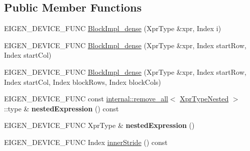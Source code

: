 \subsection*{Public Member Functions}
\begin{DoxyCompactItemize}
\item 
E\+I\+G\+E\+N\+\_\+\+D\+E\+V\+I\+C\+E\+\_\+\+F\+U\+NC \mbox{\hyperlink{class_eigen_1_1internal_1_1_block_impl__dense_3_01_xpr_type_00_01_block_rows_00_01_block_cols_00_01_inner_panel_00_01true_01_4_a72b340bbcd3acefc375e7a5eacd790f5}{Block\+Impl\+\_\+dense}} (Xpr\+Type \&xpr, Index i)
\item 
E\+I\+G\+E\+N\+\_\+\+D\+E\+V\+I\+C\+E\+\_\+\+F\+U\+NC \mbox{\hyperlink{class_eigen_1_1internal_1_1_block_impl__dense_3_01_xpr_type_00_01_block_rows_00_01_block_cols_00_01_inner_panel_00_01true_01_4_aaa47737cd19396275d5bcb6d9520e49f}{Block\+Impl\+\_\+dense}} (Xpr\+Type \&xpr, Index start\+Row, Index start\+Col)
\item 
E\+I\+G\+E\+N\+\_\+\+D\+E\+V\+I\+C\+E\+\_\+\+F\+U\+NC \mbox{\hyperlink{class_eigen_1_1internal_1_1_block_impl__dense_3_01_xpr_type_00_01_block_rows_00_01_block_cols_00_01_inner_panel_00_01true_01_4_a9e2d1e641a5000ca0c10b1eaeab84adf}{Block\+Impl\+\_\+dense}} (Xpr\+Type \&xpr, Index start\+Row, Index start\+Col, Index block\+Rows, Index block\+Cols)
\item 
\mbox{\label{class_eigen_1_1internal_1_1_block_impl__dense_3_01_xpr_type_00_01_block_rows_00_01_block_cols_00_01_inner_panel_00_01true_01_4_a40239b9d0e6a94820f79cf2ff76ccf1f}} 
E\+I\+G\+E\+N\+\_\+\+D\+E\+V\+I\+C\+E\+\_\+\+F\+U\+NC const \mbox{\hyperlink{struct_eigen_1_1internal_1_1remove__all}{internal\+::remove\+\_\+all}}$<$ \mbox{\hyperlink{struct_eigen_1_1internal_1_1true__type}{Xpr\+Type\+Nested}} $>$\+::type \& {\bfseries nested\+Expression} () const
\item 
\mbox{\label{class_eigen_1_1internal_1_1_block_impl__dense_3_01_xpr_type_00_01_block_rows_00_01_block_cols_00_01_inner_panel_00_01true_01_4_af4cf3afb073a0e36d166c0ab458ec446}} 
E\+I\+G\+E\+N\+\_\+\+D\+E\+V\+I\+C\+E\+\_\+\+F\+U\+NC Xpr\+Type \& {\bfseries nested\+Expression} ()
\item 
E\+I\+G\+E\+N\+\_\+\+D\+E\+V\+I\+C\+E\+\_\+\+F\+U\+NC Index \mbox{\hyperlink{class_eigen_1_1internal_1_1_block_impl__dense_3_01_xpr_type_00_01_block_rows_00_01_block_cols_00_01_inner_panel_00_01true_01_4_a91fea2e027a3b057b5f70ab52a1a24b7}{inner\+Stride}} () const

\end{DoxyCompactItemize}
